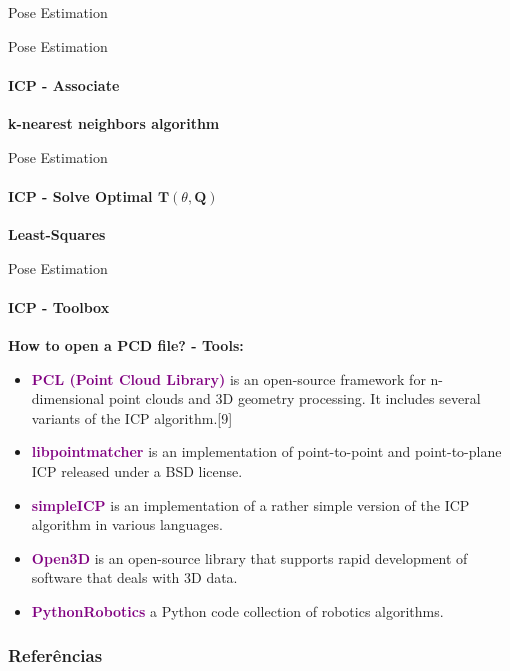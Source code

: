 \documentclass[aspectratio=169]{beamer}
\begin{document}
\begin{frame}[fragile, t]{Pose Estimation}
\begin{minipage}{0.4\textwidth}
\begin{figure}
{}
	\end{figure}
\end{minipage}
\end{frame}


\begin{frame}[fragile, t]{Pose Estimation}
	\framesubtitle{ICP - Associate}

	\textbf{k-nearest neighbors algorithm}

\end{frame}


\begin{frame}[fragile, t]{Pose Estimation}
	\framesubtitle{ICP - Solve Optimal $\mathbf{T}(\theta, \mathbf{Q})$}

	\textbf{Least-Squares}

\end{frame}

\begin{frame}[fragile, t]{Pose Estimation}
	\framesubtitle{ICP - Toolbox}

	
	\textbf{How to open a PCD file? - Tools:}
	\begin{itemize}
		\item \textcolor{purple}{\textbf{PCL (Point Cloud Library)}} is an open-source framework for n-dimensional point clouds and 3D geometry processing. It includes several variants of the ICP algorithm.[9]
		\item \textcolor{purple}{\textbf{libpointmatcher}} is an implementation of point-to-point and point-to-plane ICP released under a BSD license.
		\item \textcolor{purple}{\textbf{simpleICP}} is an implementation of a rather simple version of the ICP algorithm in various languages.
		\item \textcolor{purple}{\textbf{Open3D}} is an open-source library that supports rapid development of software that deals with 3D data. 
		\item \textcolor{purple}{\textbf{PythonRobotics}} a Python code collection of robotics algorithms.
	\end{itemize}

\end{frame}


\begin{frame}[t, allowframebreaks]
	\frametitle{Referências}
	
\end{frame}
\end{document}
